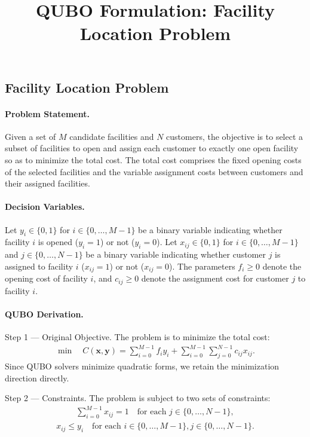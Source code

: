 \documentclass[12pt]{article}
\title{QUBO Formulation: Facility Location Problem}
\date{}
\begin{document}
\maketitle

\subsection*{Facility Location Problem}

\paragraph{Problem Statement.}
Given a set of $M$ candidate facilities and $N$ customers, the objective is to select a subset of facilities to open and assign each customer to exactly one open facility so as to minimize the total cost. The total cost comprises the fixed opening costs of the selected facilities and the variable assignment costs between customers and their assigned facilities.

\paragraph{Decision Variables.}
Let $y_i \in \{0,1\}$ for $i \in \{0,\dots,M-1\}$ be a binary variable indicating whether facility $i$ is opened ($y_i=1$) or not ($y_i=0$). Let $x_{ij} \in \{0,1\}$ for $i \in \{0,\dots,M-1\}$ and $j \in \{0,\dots,N-1\}$ be a binary variable indicating whether customer $j$ is assigned to facility $i$ ($x_{ij}=1$) or not ($x_{ij}=0$). The parameters $f_i \ge 0$ denote the opening cost of facility $i$, and $c_{ij} \ge 0$ denote the assignment cost for customer $j$ to facility $i$.

\paragraph{QUBO Derivation.}
Step 1 --- Original Objective. The problem is to minimize the total cost:
\begin{align}
\min \quad C(\mathbf{x},\mathbf{y}) = \sum_{i=0}^{M-1} f_i y_i + \sum_{i=0}^{M-1} \sum_{j=0}^{N-1} c_{ij} x_{ij}.
\end{align}
Since QUBO solvers minimize quadratic forms, we retain the minimization direction directly.

Step 2 --- Constraints. The problem is subject to two sets of constraints:
\begin{align}
\sum_{i=0}^{M-1} x_{ij} = 1 \quad \text{for each } j \in \{0,\dots,N-1\}, \tag{C1}
\end{align}
\begin{align}
x_{ij} \le y_i \quad \text{for each } i \in \{0,\dots,M-1\}, j \in \{0,\dots,N-1\}. \tag{C2}
\end{align}
\end{document}
